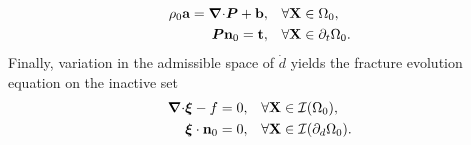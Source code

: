 \begin{subequations}
  \begin{align}
    \rho_0\textbf{a} = {\boldsymbol{\nabla} \cdot}\boldsymbol{P} + \textbf{b}, & \quad \forall \textbf{X} \in \Omega_0,           \\
    \boldsymbol{P}\textbf{n}_0 = \textbf{t},                & \quad \forall \textbf{X} \in \partial_t\Omega_0. 
  \end{align}
\end{subequations}
Finally, variation in the admissible space of $\dot{d}$ yields the fracture evolution equation on the inactive set
\begin{align}
  {\boldsymbol{\nabla}\cdot} \boldsymbol{\xi} - f = 0, & \quad \forall \textbf{X} \in \mathcal{I}(\Omega_0),           \\
  \boldsymbol{\xi}\cdot\textbf{n}_0 = 0,   & \quad \forall \textbf{X} \in \mathcal{I}(\partial_d\Omega_0). 
\end{align}
